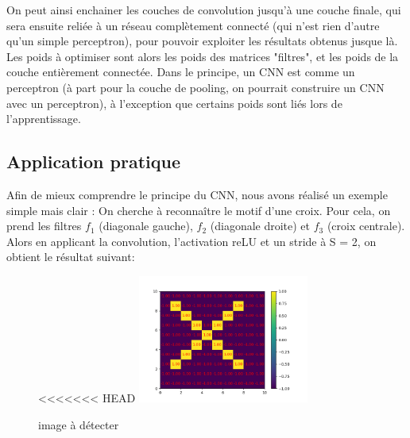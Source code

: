On peut ainsi enchainer les couches de convolution jusqu'à une couche finale, qui sera ensuite reliée à un réseau complètement connecté (qui n'est rien d'autre qu'un simple perceptron), pour pouvoir exploiter les résultats obtenus jusque là.
Les poids à optimiser sont alors les poids des matrices "filtres", et les poids de la couche entièrement connectée.
Dans le principe, un CNN est comme un perceptron (à part pour la couche de pooling, on pourrait construire un CNN avec un perceptron), à l'exception que certains poids sont liés lors de l'apprentissage. 

\subsection{Application pratique}

Afin de mieux comprendre le principe du CNN, nous avons réalisé un exemple simple mais clair : 
On cherche à reconnaître le motif d'une croix. 
Pour cela, on prend les filtres $f_1$ (diagonale gauche), $f_2$ (diagonale droite) et $f_3$ (croix centrale).
Alors en applicant la convolution, l'activation reLU et un stride à S = 2, on obtient le résultat suivant:

\begin{figure}[h]
<<<<<<< HEAD
    \center
    \includegraphics[width=0.5\textwidth]{img/cnn_exemple/cross/image_croix.png}
    \caption{image à détecter}
\end{figure}


